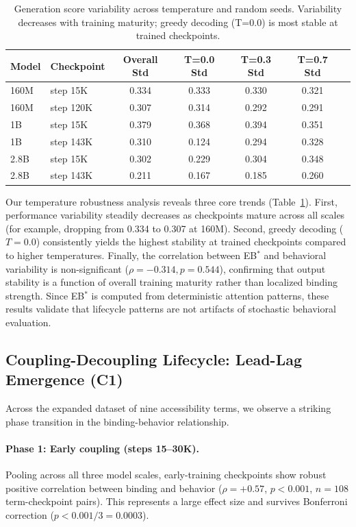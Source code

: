 \documentclass[10pt]{article} %
\begin{document}
\begin{table}[h]
\centering
\small
\begin{tabular}{|l|l|c|c|c|c|c|}
\hline
\textbf{Model} & \textbf{Checkpoint} & \textbf{Overall Std} & \textbf{T=0.0 Std} & \textbf{T=0.3 Std} & \textbf{T=0.7 Std} \\
\hline
160M & step 15K & 0.334 & 0.333 & 0.330 & 0.321 \\
160M & step 120K & 0.307 & 0.314 & 0.292 & 0.291 \\
1B & step 15K & 0.379 & 0.368 & 0.394 & 0.351 \\
1B & step 143K & 0.310 & 0.124 & 0.294 & 0.328 \\
2.8B & step 15K & 0.302 & 0.229 & 0.304 & 0.348 \\
2.8B & step 143K & 0.211 & 0.167 & 0.185 & 0.260 \\
\hline
\end{tabular}
\caption{Generation score variability across temperature and random seeds. Variability decreases with training maturity; greedy decoding (T=0.0) is most stable at trained checkpoints.}
\label{tab:temperature_main}
\end{table}

Our temperature robustness analysis reveals three core trends (Table~\ref{tab:temperature_main}). First, performance variability steadily decreases as checkpoints mature across all scales (for example, dropping from 0.334 to 0.307 at 160M). Second, greedy decoding ($T=0.0$) consistently yields the highest stability at trained checkpoints compared to higher temperatures. Finally, the correlation between EB$^*$ and behavioral variability is non-significant ($\rho = -0.314, p = 0.544$), confirming that output stability is a function of overall training maturity rather than localized binding strength.
Since EB$^*$ is computed from deterministic attention patterns, these results validate that lifecycle patterns are not artifacts of stochastic behavioral evaluation.

\subsection{Coupling-Decoupling Lifecycle: Lead-Lag Emergence (C1)}

Across the expanded dataset of nine accessibility terms, we observe a striking phase transition in the binding-behavior relationship.

\paragraph{Phase 1: Early coupling (steps 15--30K).}
Pooling across all three model scales, early-training checkpoints show robust positive correlation between binding and behavior ($\rho=+0.57$, $p<0.001$, $n=108$ term-checkpoint pairs).
This represents a large effect size and survives Bonferroni correction ($p<0.001/3=0.0003$).
\end{document}
